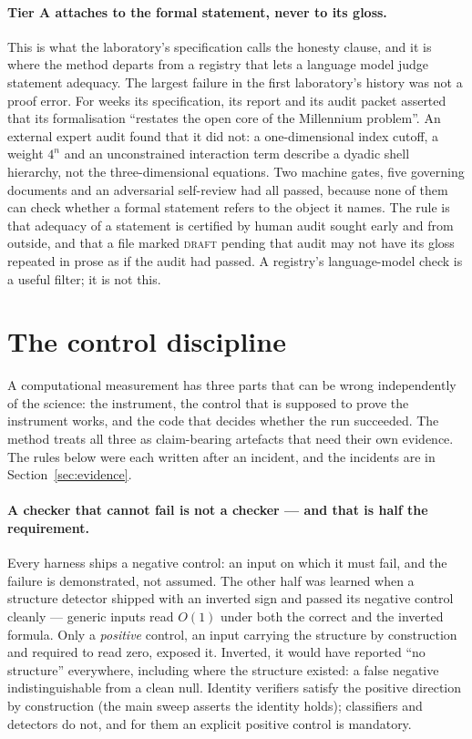 \documentclass[11pt]{article}
\begin{document}
\paragraph{Tier A attaches to the formal statement, never to its gloss.} This is what the
laboratory's specification calls the honesty clause, and it is where the method departs from a
registry that lets a language model judge
statement adequacy. The largest failure in the first laboratory's history was not a proof error.
For weeks its specification, its report and its audit packet asserted that its formalisation
``restates the open core of the Millennium problem''. An external expert audit found that it did
not: a one-dimensional index cutoff, a weight $4^n$ and an unconstrained interaction term
describe a dyadic shell hierarchy, not the three-dimensional equations. Two machine gates, five
governing documents and an adversarial self-review had all passed, because none of them can
check whether a formal statement refers to the object it names. The rule is that adequacy of a
statement is certified by human audit sought early and from outside, and that a file marked
\textsc{draft} pending that audit may not have its gloss repeated in prose as if the audit had
passed. A registry's language-model check is a useful filter; it is not this.

\section{The control discipline}
\label{sec:controls}

A computational measurement has three parts that can be wrong independently of the science: the
instrument, the control that is supposed to prove the instrument works, and the code that decides
whether the run succeeded. The method treats all three as claim-bearing artefacts that need
their own evidence. The rules below were each written after an incident, and the incidents are
in Section~\ref{sec:evidence}.

\paragraph{A checker that cannot fail is not a checker --- and that is half the requirement.}
Every harness ships a negative control: an input on which it must fail, and the failure is
demonstrated, not assumed. The other half was learned when a structure detector shipped with
an inverted sign and passed its negative control cleanly --- generic inputs read $O(1)$ under
both the correct and the inverted formula. Only a \emph{positive} control, an input carrying the
structure by construction and required to read zero, exposed it. Inverted, it would have
reported ``no structure'' everywhere, including where the structure existed: a false negative
indistinguishable from a clean null. Identity verifiers satisfy the positive direction by
construction (the main sweep asserts the identity holds); classifiers and detectors do not, and
for them an explicit positive control is mandatory.
\end{document}
